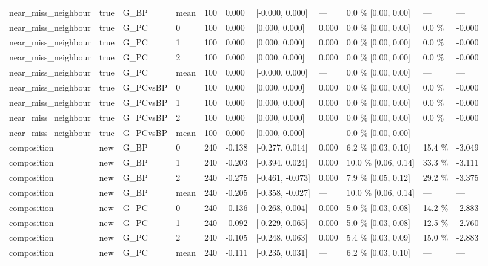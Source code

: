 \documentclass[10pt,a4paper]{article}
\begin{document}
\begin{center}
\begin{tabularx}{\textwidth}{@{}p{}XXXXXXXXXX@{}}
near\_miss\_neighbour & true & G\_BP & mean & 100 & 0.000 & [-0.000, 0.000] & — & 0.0 \% [0.00, 0.00] & — & — \\
near\_miss\_neighbour & true & G\_PC & 0 & 100 & 0.000 & [0.000, 0.000] & 0.000 & 0.0 \% [0.00, 0.00] & 0.0 \% & -0.000 \\
near\_miss\_neighbour & true & G\_PC & 1 & 100 & 0.000 & [0.000, 0.000] & 0.000 & 0.0 \% [0.00, 0.00] & 0.0 \% & -0.000 \\
near\_miss\_neighbour & true & G\_PC & 2 & 100 & 0.000 & [0.000, 0.000] & 0.000 & 0.0 \% [0.00, 0.00] & 0.0 \% & -0.000 \\
near\_miss\_neighbour & true & G\_PC & mean & 100 & 0.000 & [-0.000, 0.000] & — & 0.0 \% [0.00, 0.00] & — & — \\
near\_miss\_neighbour & true & G\_PCvsBP & 0 & 100 & 0.000 & [0.000, 0.000] & 0.000 & 0.0 \% [0.00, 0.00] & 0.0 \% & -0.000 \\
near\_miss\_neighbour & true & G\_PCvsBP & 1 & 100 & 0.000 & [0.000, 0.000] & 0.000 & 0.0 \% [0.00, 0.00] & 0.0 \% & -0.000 \\
near\_miss\_neighbour & true & G\_PCvsBP & 2 & 100 & 0.000 & [0.000, 0.000] & 0.000 & 0.0 \% [0.00, 0.00] & 0.0 \% & -0.000 \\
near\_miss\_neighbour & true & G\_PCvsBP & mean & 100 & 0.000 & [0.000, 0.000] & — & 0.0 \% [0.00, 0.00] & — & — \\
composition & new & G\_BP & 0 & 240 & -0.138 & [-0.277, 0.014] & 0.000 & 6.2 \% [0.03, 0.10] & 15.4 \% & -3.049 \\
composition & new & G\_BP & 1 & 240 & -0.203 & [-0.394, 0.024] & 0.000 & 10.0 \% [0.06, 0.14] & 33.3 \% & -3.111 \\
composition & new & G\_BP & 2 & 240 & -0.275 & [-0.461, -0.073] & 0.000 & 7.9 \% [0.05, 0.12] & 29.2 \% & -3.375 \\
composition & new & G\_BP & mean & 240 & -0.205 & [-0.358, -0.027] & — & 10.0 \% [0.06, 0.14] & — & — \\
composition & new & G\_PC & 0 & 240 & -0.136 & [-0.268, 0.004] & 0.000 & 5.0 \% [0.03, 0.08] & 14.2 \% & -2.883 \\
composition & new & G\_PC & 1 & 240 & -0.092 & [-0.229, 0.065] & 0.000 & 5.0 \% [0.03, 0.08] & 12.5 \% & -2.760 \\
composition & new & G\_PC & 2 & 240 & -0.105 & [-0.248, 0.063] & 0.000 & 5.4 \% [0.03, 0.09] & 15.0 \% & -2.883 \\
composition & new & G\_PC & mean & 240 & -0.111 & [-0.235, 0.031] & — & 6.2 \% [0.03, 0.10] & — & — \\

\end{tabularx}
\end{center}
\end{document}
